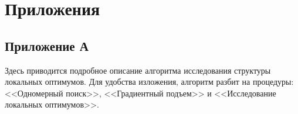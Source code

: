 \chapter*{Приложения}
\section*{Приложение А}\label{sec:applic_a}
Здесь приводится подробное описание алгоритма исследования структуры локальных оптимумов. Для удобства изложения, алгоритм разбит
на процедуры: <<Одномерный поиск>>, <<Градиентный подъем>> и <<Исследование локальных оптимумов>>.
\\ \\

